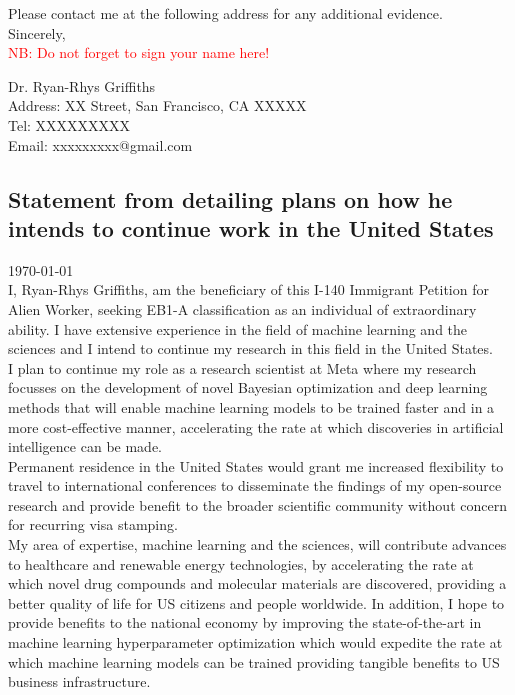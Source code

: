 \documentclass[11pt]{article}
\begin{document}
Please contact me at the following address for any additional evidence.\\

Sincerely,\\

\textcolor{red}{NB: Do not forget to sign your name here!}


\vspace{1.5em}
Dr. Ryan-Rhys Griffiths\\

Address: XX Street, San Francisco, CA XXXXX\\
Tel: XXXXXXXXX\\
Email: xxxxxxxxx@gmail.com\\

\newpage



\subsection*{Statement from \dr detailing plans on how he intends to continue work in the United States}

\today\\

I, Ryan-Rhys Griffiths, am the beneficiary of this I-140 Immigrant Petition for Alien Worker, seeking EB1-A classification as an individual of extraordinary ability. I have extensive experience in the field of machine learning and the sciences and I intend to continue my research in this field in the United States. \\

I plan to continue my role as a research scientist at Meta where my research focusses on the development of novel Bayesian optimization and deep learning methods that will enable machine learning models to be trained faster and in a more cost-effective manner, accelerating the rate at which discoveries in artificial intelligence can be made.\\

Permanent residence in the United States would grant me increased flexibility to travel to international conferences to disseminate the findings of my open-source research and provide benefit to the broader scientific community without concern for recurring visa stamping. \\

My area of expertise, machine learning and the sciences, will contribute advances to healthcare and renewable energy technologies, by accelerating the rate at which novel drug compounds and molecular materials are discovered, providing a better quality of life for US citizens and people worldwide. In addition, I hope to provide benefits to the national economy by improving the state-of-the-art in machine learning hyperparameter optimization which would expedite the rate at which machine learning models can be trained providing tangible benefits to US business infrastructure.\\
\end{document}
